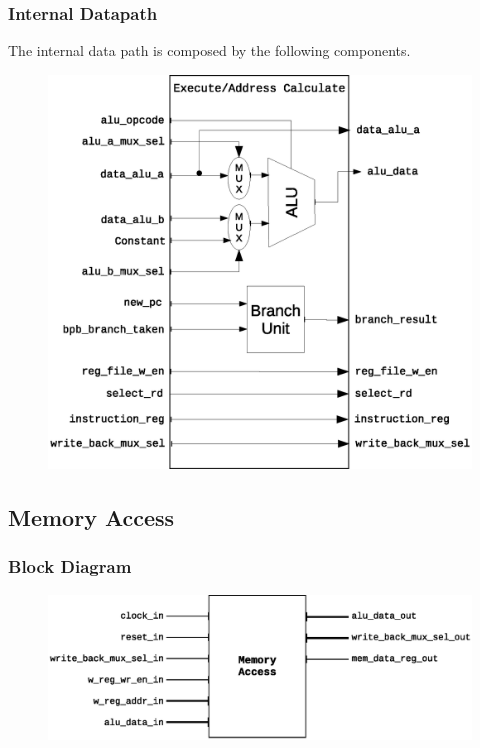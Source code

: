 \documentclass{article}
\begin{document}
\subsubsection{Internal Datapath} 
  The internal data path is composed by the following components.

  \begin{figure}[H]
    \centering
    \includegraphics[width=.7\linewidth]{pictures/datapath/ex_datapath.eps}
  \end{figure}  

  \newpage
  \subsection{Memory Access}
  \subsubsection{Block Diagram}
  \begin{figure}[H]
    \centering
    \includegraphics[width=\linewidth]{pictures/blocks/mem_block.eps}
  \end{figure} 
\end{document}

